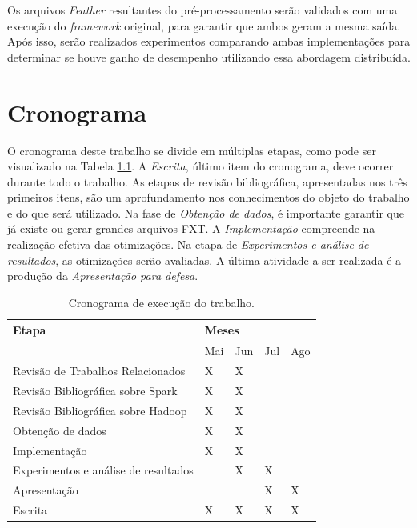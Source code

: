 \documentclass[prop-esp]{iiufrgs}
\begin{document}
Os arquivos \emph{Feather} resultantes do pré-processamento serão validados com uma execução do \emph{framework} original, para garantir que ambos geram a mesma saída. Após isso, serão realizados experimentos comparando ambas implementações para determinar se houve ganho de desempenho utilizando essa abordagem distribuída.

%
\chapter{Cronograma} \label{lbl:cronog}

O cronograma deste trabalho se divide em múltiplas etapas, como pode ser visualizado na Tabela \ref{tab:cronog}. A \emph{Escrita}, último item do cronograma, deve ocorrer durante todo o trabalho. As etapas de revisão bibliográfica, apresentadas nos três primeiros itens, são um aprofundamento nos conhecimentos do objeto do trabalho e do que será utilizado. Na fase de \emph{Obtenção de dados}, é importante garantir que já existe ou gerar grandes arquivos FXT. A \emph{Implementação} compreende na realização efetiva das otimizações. Na etapa de \emph{Experimentos e análise de resultados}, as otimizações serão avaliadas. A última atividade a ser realizada é a produção da \emph{Apresentação para defesa}.


\begin{table}[H]
\centering
\begin{tabular}{p{3.0in}p{0.5in}p{0.5in}p{0.5in}p{0.5in}} \toprule
\textbf{Etapa}  &  \multicolumn{4}{p{2.0in}}{\textbf{Meses}}  \\ \midrule
       & Mai & Jun & Jul & Ago \\ \bottomrule
Revisão de Trabalhos Relacionados & X & X &  &  \\
Revisão Bibliográfica sobre Spark & X & X &  &  \\
Revisão Bibliográfica sobre Hadoop & X & X & & \\
Obtenção de dados  & X & X &  &  \\
Implementação & X & X &  &  \\
Experimentos e análise de resultados &  & X & X &  \\
Apresentação &  &  & X & X \\ 
Escrita & X & X & X & X \\ \bottomrule
\end{tabular}
    \label{tab:cronog}
    \caption{Cronograma de execução do trabalho.}
\end{table}

%

 
\end{document}
